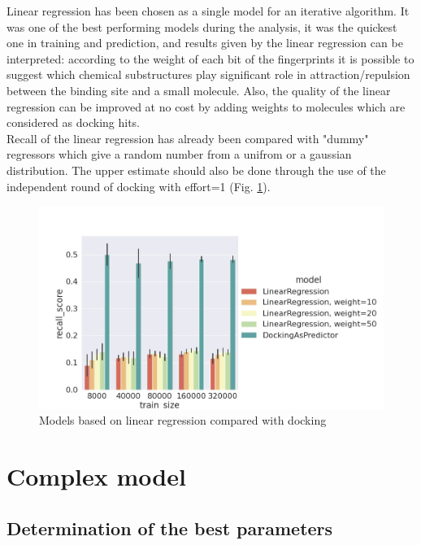Linear regression has been chosen as a single model for an iterative algorithm. 
It was one of the best performing models during the analysis, it was the quickest one in training and prediction, and results given by the linear regression can be interpreted: according to the weight of each bit of the fingerprints it is possible to suggest which chemical substructures play significant role in attraction/repulsion between the binding site and a small molecule. 
Also, the quality of the linear regression can be improved at no cost by adding weights to molecules which are considered as docking hits.\\

Recall of the linear regression has already been compared with "dummy" regressors which give a random number from a unifrom or a gaussian distribution.
The upper estimate should also be done through the use of the independent round of docking with effort=1 (Fig. \ref{linregVSdocking}).

\begin{figure}[H]
\includegraphics[scale = 0.45]{Images/LRvsD.jpg}
\caption{Models based on linear regression compared with docking}
\label{linregVSdocking}
\end{figure}

\hfill\break
\section{Complex model}

\subsection{Determination of the best parameters}

